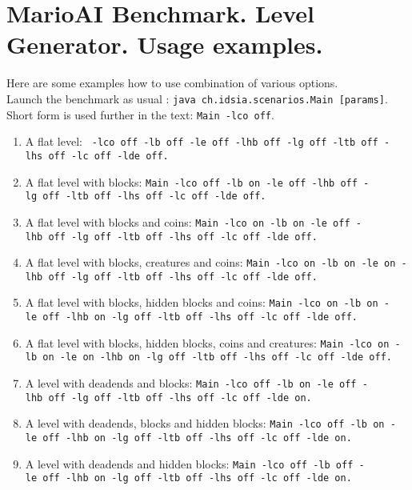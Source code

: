 \documentclass{report}
\begin{document}
\section*{MarioAI Benchmark. Level Generator. Usage examples.}
Here are some examples how to use combination of various options. \\
Launch the benchmark as usual : \texttt{java~ch.idsia.scenarios.Main [params]}. \\ Short form is used further in the text: \texttt{Main -lco off}.
\begin{enumerate}
\item A flat level: \newline %
\texttt{~-lco~off~-lb~off~-le~off~-lhb~off~-lg~off~-ltb~off~-lhs~off~-lc~off~-lde~off.}
\item A flat level with blocks:\newline %
\texttt{Main~-lco~off~-lb~on~-le~off~-lhb~off~-lg~off~-ltb~off~-lhs~off~-lc~off~-lde~off.}
\item A flat level with blocks and coins:\newline %
\texttt{Main~-lco~on~-lb~on~-le~off~-lhb~off~-lg~off~-ltb~off~-lhs~off~-lc~off~-lde~off.}
\item A flat level with blocks, creatures and coins:\newline %
\texttt{Main~-lco~on~-lb~on~-le~on~-lhb~off~-lg~off~-ltb~off~-lhs~off~-lc~off~-lde~off.}
\item A flat level with blocks, hidden blocks and coins:\newline %
\texttt{Main~-lco~on~-lb~on~-le~off~-lhb~on~-lg~off~-ltb~off~-lhs~off~-lc~off~-lde~off.}
\item A flat level with blocks, hidden blocks, coins and creatures:\newline %
\texttt{Main~-lco~on~-lb~on~-le~on~-lhb~on~-lg~off~-ltb~off~-lhs~off~-lc~off~-lde~off.}
\item A level with deadends  and blocks:\newline %
\texttt{Main~-lco~off~-lb~on~-le~off~-lhb~off~-lg~off~-ltb~off~-lhs~off~-lc~off~-lde~on.}
\item A level with deadends, blocks and hidden blocks:\newline %
\texttt{Main~-lco~off~-lb~on~-le~off~-lhb~on~-lg~off~-ltb~off~-lhs~off~-lc~off~-lde~on.}
\item A level with deadends and hidden blocks:\newline %
\texttt{Main~-lco~off~-lb~off~-le~off~-lhb~on~-lg~off~-ltb~off~-lhs~off~-lc~off~-lde~on.}

\end{enumerate}
\end{document}
